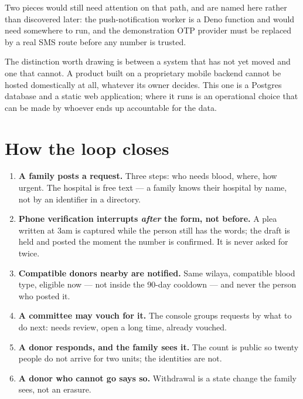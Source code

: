 \documentclass[11pt,a4paper]{article}
\begin{document}
Two pieces would still need attention on that path, and are named here rather
than discovered later: the push-notification worker is a Deno function and
would need somewhere to run, and the demonstration OTP provider must be
replaced by a real SMS route before any number is trusted.

The distinction worth drawing is between a system that has not yet moved and
one that cannot. A product built on a proprietary mobile backend cannot be
hosted domestically at all, whatever its owner decides. This one is a Postgres
database and a static web application; where it runs is an operational choice
that can be made by whoever ends up accountable for the data.

\section{How the loop closes}

\begin{enumerate}[leftmargin=1.4em]
  \item \textbf{A family posts a request.} Three steps: who needs blood, where,
        how urgent. The hospital is free text — a family knows their hospital by
        name, not by an identifier in a directory.
  \item \textbf{Phone verification interrupts \emph{after} the form, not
        before.} A plea written at 3am is captured while the person still has
        the words; the draft is held and posted the moment the number is
        confirmed. It is never asked for twice.
  \item \textbf{Compatible donors nearby are notified.} Same wilaya, compatible
        blood type, eligible now — not inside the 90-day cooldown — and never
        the person who posted it.
  \item \textbf{A committee may vouch for it.} The console groups requests by
        what to do next: needs review, open a long time, already vouched.
  \item \textbf{A donor responds, and the family sees it.} The count is public
        so twenty people do not arrive for two units; the identities are not.
  \item \textbf{A donor who cannot go says so.} Withdrawal is a state change the
        family sees, not an erasure.
\end{enumerate}

\end{document}
